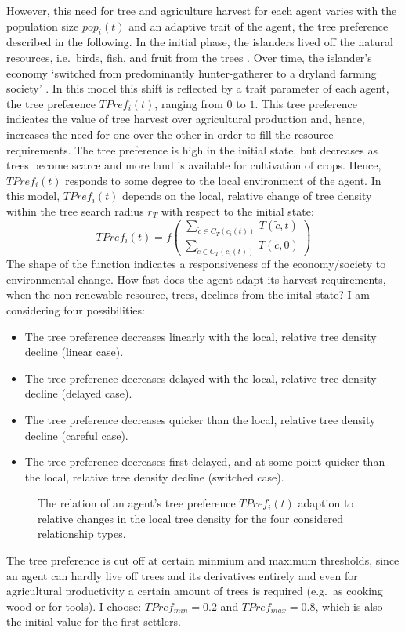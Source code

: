 However, this need for tree and agriculture harvest for each agent varies with the population size $pop_i(t)$ and an adaptive trait of the agent, the tree preference described in the following. 
In the initial phase, the islanders lived off the natural resources, i.e.\ birds, fish, and fruit from the trees \citet{Bahn2017}. 
Over time, the islander's economy `switched from predominantly hunter-gatherer to a dryland farming society' \citep{Louwagie2006}.
In this model this shift is reflected by a trait parameter of each agent, the tree preference $TPref_i(t)$, ranging from $0$ to $1$.
This tree preference indicates the value of tree harvest over agricultural production and, hence, increases the need for one over the other in order to fill the resource requirements.
The tree preference is high in the initial state, but decreases as trees become scarce and more land is available for cultivation of crops.
Hence, $TPref_i(t)$ responds to some degree to the local environment of the agent.
In this model, $TPref_i(t)$ depends on the local, relative change of tree density within the tree search radius $r_T$ with respect to the initial state:
\begin{equation}
TPref_i(t) = f\left( \, \frac{\sum_{\tilde{c} \in C_{T}(c_i(t)) } \, T(\tilde{c}, t)}{\sum_{\tilde{c} \in C_{T}(c_i(t))} \, T(\tilde{c}, 0) } \, \right)
\end{equation}
The shape of the function indicates a responsiveness of the economy/society to environmental change. How fast does the agent adapt its harvest requirements, when the non-renewable resource, trees, declines from the inital state?  
I am considering four possibilities: 
\begin{itemize}
	\item The tree preference decreases linearly with the local, relative tree density decline (linear case).  
	\item The tree preference decreases delayed with the local, relative tree density decline (delayed case).
	\item The tree preference decreases quicker than the local, relative tree density decline (careful case).
	\item The tree preference decreases first delayed, and at some point quicker than the local, relative tree density decline (switched case).
\end{itemize}
\begin{figure}
	\centering
	\caption{The relation of an agent's tree preference $TPref_i(t)$ adaption to relative changes in the local tree density for the four considered relationship types.}
	\label{fig:TPref_T}
\end{figure}
The tree preference is cut off at certain minmium and maximum thresholds, since an agent can hardly live off trees and its derivatives entirely and even for agricultural productivity a certain amount of trees is required (e.g.\ as cooking wood or for tools). 
I choose: $TPref_{min} = 0.2$ and $TPref_{max} = 0.8$, which is also the initial value for the first settlers.

